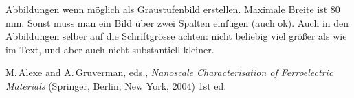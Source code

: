 \documentclass[twocolumn]{revtex4}
\begin{document}
Abbildungen wenn möglich als Graustufenbild erstellen. Maximale Breite ist 80\,mm. Sonst muss man ein Bild über zwei Spalten einfügen (auch ok). 
Auch in den Abbildungen selber auf die Schriftgrösse achten: nicht beliebig viel größer als wie im Text, und aber auch nicht substantiell kleiner.


\begin{thebibliography}{}

M.\,Alexe and A.\,Gruverman, eds., {\it Nanoscale Characterisation of
Ferroelectric Materials} (Springer, Berlin; New York, 2004) 1st ed.

\end{thebibliography}
\end{document}
